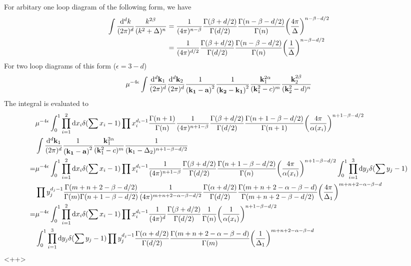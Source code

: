 \documentclass{article}
\newcommand{\vbk}{\vb{k}}
\renewcommand{\a}{\alpha}
\renewcommand{\b}{\beta}
\begin{document}
\begin{appendices}
  For arbitary one loop diagram of the following form, we have
  \begin{subequations} \label{1loopgamma}
	\begin{align}
	  \int\frac{\dd^dk}{(2\pi)^d}\frac{k^{2\b}}{(k^2+\Delta)^n}&=\frac{1}{(4\pi)^{n-\b}}\frac{\Gamma(\b+d/2)}{\Gamma(d/2)}\frac{\Gamma(n-\b-d/2)}{\Gamma(n)}\pqty{\frac{4\pi}{\Delta}}^{n-\b-d/2}\\
	  &=\frac{1}{(4\pi)^{d/2}}\frac{\Gamma(\b+d/2)}{\Gamma(d/2)}\frac{\Gamma(n-\b-d/2)}{\Gamma(n)}\pqty{\frac{1}{\Delta}}^{n-\b-d/2}
	\end{align}
  \end{subequations}
  For two loop diagrams of this form ($\epsilon=3-d$)
  \begin{align}
	\mu^{-4\epsilon}\int\frac{\dd^d\vb{k}_1}{(2\pi)^d}\frac{\dd^d\vb{k}_2}{(2\pi)^d}\frac{1}{\vb{(k_1-a)}^2}\frac{1}{\vb{(k_2-k_1)}^2}\frac{\vbk_1^{2\a}}{(\vb{k}_1^2-c)^m}\frac{\vbk_2^{2\b}}{(\vb{k}_2^2-d)^n}
	\label{int}
  \end{align}
  The integral is evaluated to
  \begin{align*}
	&\mu^{-4\epsilon}\int_0^1\prod_{i=1}^2\dd x_i\delta(\sum x_i-1)\prod x_i^{d_i-1}\frac{\Gamma(n+1)}{\Gamma(n)}\frac{1}{(4\pi)^{n+1-\b}}\frac{\Gamma(\b+d/2)}{\Gamma(d/2)}\frac{\Gamma(n+1-\b-d/2)}{\Gamma(n+1)}\pqty{\frac{4\pi}{\a(x_i)}}^{n+1-\b-d/2}
	\\&\int\frac{\dd^d\vb{k}_1}{(2\pi)^d}\frac{1}{\vb{(k_1-a)}^2}\frac{\vbk_1^{2\a}}{(\vb{k}_1^2-c)^m}\frac{1}{(\vb{k}_1-\Delta_2)^{n+1-\b-d/2}}\\
	=&\mu^{-4\epsilon}\int_0^1\prod_{i=1}^2\dd x_i\delta(\sum x_i-1)\prod x_i^{d_i-1}\frac{1}{(4\pi)^{n+1-\b}}\frac{\Gamma(\b+d/2)}{\Gamma(d/2)}\frac{\Gamma(n+1-\b-d/2)}{\Gamma(n)}\pqty{\frac{4\pi}{\a(x_i)}}^{n+1-\b-d/2}\int_0^1\prod_{i=1}^3\dd y_j\delta(\sum y_j-1)
	\\&\prod y_j^{d_j-1}
	\frac{\Gamma(m+n+2-\b-d/2)}{\Gamma(m)\Gamma(n+1-\b-d/2)}\frac{1}{(4\pi)^{m+n+2-\a-\b-d/2}}\frac{\Gamma(\a+d/2)}{\Gamma(d/2)}\frac{\Gamma(m+n+2-\a-\b-d)}{\Gamma(m+n+2-\b-d/2)}\pqty{\frac{4\pi}{\Delta_1}}^{m+n+2-\a-\b-d}
	\\
	=&\mu^{-4\epsilon}\int_0^1\prod_{i=1}^2\dd x_i\delta(\sum x_i-1)\prod x_i^{d_i-1}\frac{1}{(4\pi)^{d}}\frac{\Gamma(\b+d/2)}{\Gamma(d/2)}\frac{1}{\Gamma(n)}\pqty{\frac{1}{\a(x_i)}}^{n+1-\b-d/2}
	\\&\int_0^1\prod_{i=1}^3\dd y_j\delta(\sum y_j-1)\prod y_j^{d_j-1}\frac{\Gamma(\a+d/2)}{\Gamma(d/2)}\frac{\Gamma(m+n+2-\a-\b-d)}{\Gamma(m)}\pqty{\frac{1}{\Delta_1}}^{m+n+2-\a-\b-d}
  \end{align*}<++>
\end{appendices}
\end{document}

